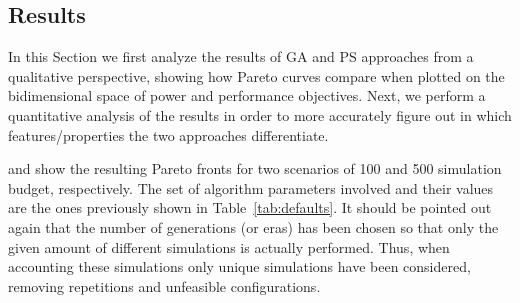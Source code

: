 \subsection{Results}

In this Section we first analyze the results of GA and PS approaches from a
qualitative perspective, showing how Pareto curves compare when
plotted on the bidimensional space of power and performance
objectives. Next, we perform a quantitative
analysis of the results in order to more accurately figure out in which
features/properties the two approaches differentiate.

 and  show the
resulting Pareto fronts for two scenarios of 100 and 500
simulation budget, respectively. The set of algorithm parameters involved and their
values are the ones previously shown in Table~\ref{tab:defaults}. It
should be pointed out again that the number of generations (or eras)
has been chosen so that only the given amount of different simulations is
actually performed. Thus, when accounting these simulations only
unique simulations have been considered, removing repetitions and
unfeasible configurations.

%


